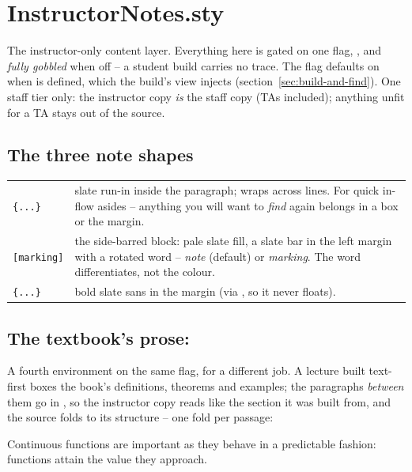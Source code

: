 \section{InstructorNotes.sty}\label{sec:ref-instructornotes}

The instructor-only content layer. Everything here is gated on one flag,
, and \emph{fully gobbled} when off -- a student
build carries no trace. The flag defaults on when  is
defined, which the build's  view injects
(section~\ref{sec:build-and-find}). One staff tier only: the instructor
copy \emph{is} the staff copy (TAs included); anything unfit for a TA stays
out of the source.

\subsection*{The three note shapes}

\begin{center}
\begin{tabularx}{\linewidth}{@{}l Y@{}}
\texttt{\{...\}} & slate run-in inside the paragraph;
  wraps across lines. For quick in-flow asides -- anything you will want to
  \emph{find} again belongs in a box or the margin.\\
\texttt{[marking]} & the side-barred block: pale slate
  fill, a slate bar in the left margin with a rotated word -- \emph{note}
  (default) or \emph{marking}. The word differentiates, not the colour.\\
\texttt{\{...\}} & bold slate sans in the margin
  (via , so it never floats).\\
\end{tabularx}
\end{center}

\subsection*{The textbook's prose: }

A fourth environment on the same flag, for a different job. A lecture built
text-first boxes the book's definitions, theorems and examples; the paragraphs
\emph{between} them go in , so the instructor copy reads like
the section it was built from, and the source folds to its structure -- one
fold per passage:

\begin{manexample}
\instructornotestrue
\begin{textprose}
  Continuous functions are important as they behave in a
  predictable fashion: functions attain the value they approach.
\end{textprose}
\end{manexample}

